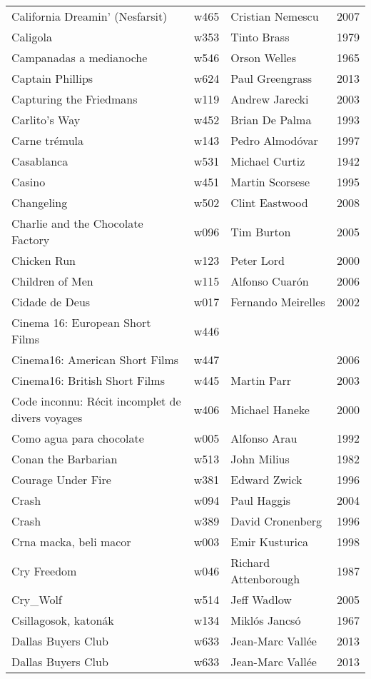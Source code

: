\documentclass{article}
\begin{document}
\begin {center}
\begin{longtable}{p{10cm} l l l}
California Dreamin' (Nesfarsit) & w465 & Cristian Nemescu & 2007 \\
Caligola & w353 & Tinto Brass & 1979 \\
Campanadas a medianoche & w546 & Orson Welles & 1965 \\
Captain Phillips & w624 & Paul Greengrass & 2013 \\
Capturing the Friedmans & w119 & Andrew Jarecki & 2003 \\
Carlito's Way & w452 & Brian De Palma & 1993 \\
Carne trémula & w143 & Pedro Almodóvar & 1997 \\
Casablanca & w531 & Michael Curtiz & 1942 \\
Casino & w451 & Martin Scorsese & 1995 \\
Changeling & w502 & Clint Eastwood & 2008 \\
Charlie and the Chocolate Factory & w096 & Tim Burton & 2005 \\
Chicken Run & w123 & Peter Lord & 2000 \\
Children of Men & w115 & Alfonso Cuarón & 2006 \\
Cidade de Deus & w017 & Fernando Meirelles & 2002 \\
Cinema 16: European Short Films & w446 &  &  \\
Cinema16: American Short Films & w447 &  & 2006 \\
Cinema16: British Short Films & w445 & Martin Parr & 2003 \\
Code inconnu: Récit incomplet de divers voyages & w406 & Michael Haneke & 2000 \\
Como agua para chocolate & w005 & Alfonso Arau & 1992 \\
Conan the Barbarian & w513 & John Milius & 1982 \\
Courage Under Fire & w381 & Edward Zwick & 1996 \\
Crash & w094 & Paul Haggis & 2004 \\
Crash & w389 & David Cronenberg & 1996 \\
Crna macka, beli macor & w003 & Emir Kusturica & 1998 \\
Cry Freedom & w046 & Richard Attenborough & 1987 \\
Cry\_Wolf & w514 & Jeff Wadlow & 2005 \\
Csillagosok, katonák & w134 & Miklós Jancsó & 1967 \\
Dallas Buyers Club & w633 & Jean-Marc Vallée & 2013 \\
Dallas Buyers Club & w633 & Jean-Marc Vallée & 2013 \\

\end{longtable}
\end{center}
\end{document}

